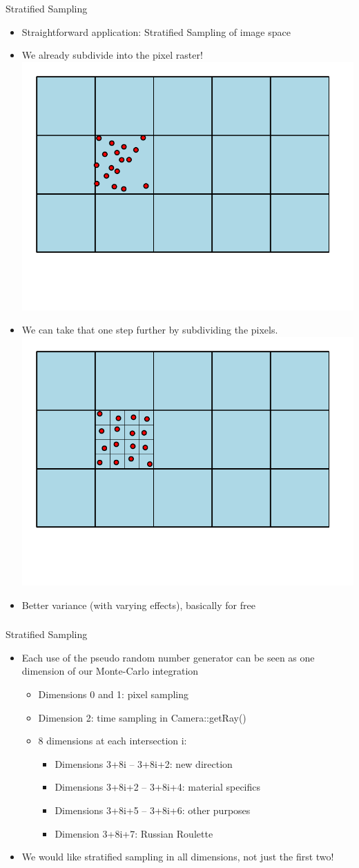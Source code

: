 \documentclass[utf8,stillsansserifmath,fleqn,t]{beamer}
\begin{document}
\begin{frame}[label=stratified-2]
\frametitle{\insertsection}
Stratified Sampling
\begin{itemize}
\item Straightforward application: Stratified Sampling of image space
\item We already subdivide into the pixel raster!\\
\includegraphics[width=.3\textwidth]{./fig/stratified-sampling-pixelspace.pdf}
\item We can take that one step further by subdividing the pixels.\\
\includegraphics[width=.3\textwidth]{./fig/stratified-sampling-subpixelspace.pdf}
\item Better variance (with varying effects), basically for free
\end{itemize}
\end{frame}

\begin{frame}
\frametitle{\insertsection}
Stratified Sampling
\begin{itemize}
\item Each use of the pseudo random number generator can be seen
as one dimension of our Monte-Carlo integration
\begin{itemize}
\item Dimensions 0 and 1: pixel sampling
\item Dimension 2: time sampling in Camera::getRay()
\item 8 dimensions at each intersection i:
\begin{itemize}
\item Dimensions 3+8i\hphantom{+0} --  3+8i+2: new direction
\item Dimensions 3+8i+2 --  3+8i+4: material specifics
\item Dimensions 3+8i+5 --  3+8i+6: other purposes
\item Dimension\hphantom{s} 3+8i+7\hphantom{ -- 0+0i+0}: Russian Roulette
\end{itemize}
\end{itemize}
\item We would like stratified sampling in all dimensions, not just the first
two!
\end{itemize}
\end{frame}
\end{document}
